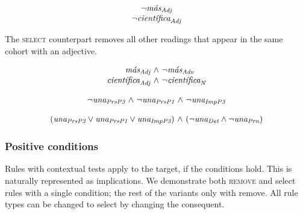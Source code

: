 
\begin{equation}
\begin{array}{c}
\neg{}\masAdj \\
\neg{}\cientificaAdj
\end{array}
\label{eq:rmAdj}
\end{equation}

The \textsc{select} counterpart removes all other readings that appear in the same cohort with an adjective.

\begin{equation}
\begin{array}{r @{~\wedge~} l }
\masAdj        & \neg{}\masAdv \\
\cientificaAdj & \neg{}\cientificaN \\
\end{array}
\label{eq:slAdj}
\end{equation}


\noindent 


\begin{equation}
\begin{array}{c @{~\wedge~} c @{~\wedge~} c}
\neg{} \unaPrsPThree  & \neg \unaPrsPOne & \neg \unaImp
\end{array}
\label{eq:rmVb}
\end{equation}


\begin{equation}
\begin{array}{c @{~\wedge~} c}
(\unaPrsPThree  \vee \unaPrsPOne \vee \unaImp) & (\neg \unaDet \wedge \neg \unaPrn) \\
\end{array}
\label{eq:slVb}
\end{equation}


\subsubsection{Positive conditions} 

Rules with contextual tests apply to the target, if the conditions hold.
This is naturally represented as implications. We demonstrate both \textsc{remove} and {\sc select} rules with a single condition; the rest of the variants only with {\sc remove}. All rule types can be changed to {\sc select} by changing the consequent.



